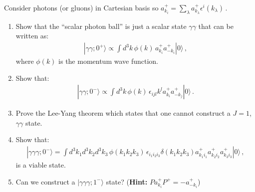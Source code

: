 Consider photons (or gluons) in Cartesian basis so $a^+_{k_{i}} = \sum_\lambda a^+_{k_{\lambda}} \epsilon^i (k_{\lambda})$\,.
\begin{enumerate}
      \item Show that the ``scalar photon ball'' is just a scalar state $\gamma\gamma$ that can be written as:
            \begin{align}
                  | \gamma\gamma; 0^+ \rangle \propto \int d^3 k \, \phi(k) \, a^+_{k_{i}}a^+_{-k_{i}}| 0 \rangle\,,
            \end{align}
            where $\phi(k)$ is the momentum wave function.
      \item Show that:
            \begin{align}
                  | \gamma\gamma; 0^- \rangle \propto \int d^3 k \, \phi(k) \,\epsilon_{ijl} k^l a^+_{k_{i}}a^+_{-k_{j}}| 0 \rangle\,.
            \end{align}

      \item Prove the Lee-Yang theorem which states that one cannot construct a $J = 1$, $\gamma\gamma$  state.
      \item  Show that:
            \begin{align}
                  | \gamma\gamma\gamma; 0^- \rangle= \int d^3 k_1 d^3 k_2 d^3 k_3 \, \phi(k_1k_2k_3) \, \epsilon_{i_1i_2i_3}\delta(k_1k_2k_3) a^+_{k_{1}i_1}a^+_{k_{2}i_2}a^+_{k_{3}i_3}| 0 \rangle\,,
            \end{align}
            is a viable state.
      \item  Can we construct a $| \gamma\gamma\gamma; 1^- \rangle$ state?
            (\textbf{Hint:}     $Pa^+_{k_i}P^+=-a^+_{-k_i}$)
\end{enumerate}
